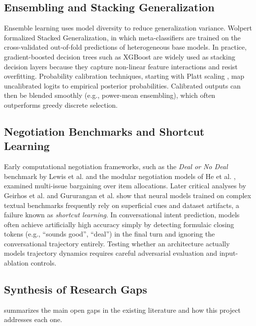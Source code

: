 \subsection{Ensembling and Stacking Generalization}
Ensemble learning uses model diversity to reduce generalization variance. Wolpert \cite{wolpert1992stacked} formalized Stacked Generalization, in which meta-classifiers are trained on the cross-validated out-of-fold predictions of heterogeneous base models. In practice, gradient-boosted decision trees such as XGBoost \cite{chen2016xgboost} are widely used as stacking decision layers because they capture non-linear feature interactions and resist overfitting. Probability calibration techniques, starting with Platt scaling \cite{platt1999probabilistic}, map uncalibrated logits to empirical posterior probabilities. Calibrated outputs can then be blended smoothly (e.g., power-mean ensembling), which often outperforms greedy discrete selection.

\subsection{Negotiation Benchmarks and Shortcut Learning}
Early computational negotiation frameworks, such as the \textit{Deal or No Deal} benchmark by Lewis et al. \cite{lewis2017deal} and the modular negotiation models of He et al. \cite{he2018decoupling}, examined multi-issue bargaining over item allocations. Later critical analyses by Geirhos et al. \cite{geirhos2020shortcut} and Gururangan et al. \cite{gururangan2018annotation} show that neural models trained on complex textual benchmarks frequently rely on superficial cues and dataset artifacts, a failure known as \textit{shortcut learning}. In conversational intent prediction, models often achieve artificially high accuracy simply by detecting formulaic closing tokens (e.g., ``sounds good'', ``deal'') in the final turn and ignoring the conversational trajectory entirely. Testing whether an architecture actually models trajectory dynamics requires careful adversarial evaluation and input-ablation controls.

\subsection{Synthesis of Research Gaps}
 summarizes the main open gaps in the existing literature and how this project addresses each one.

